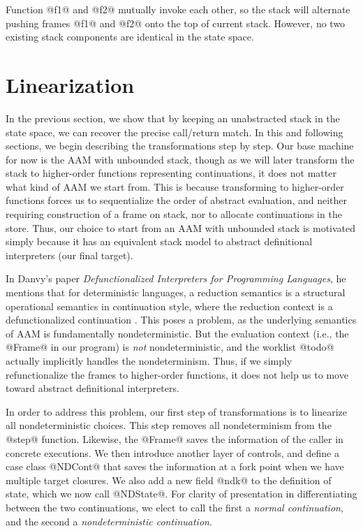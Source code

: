 \documentclass[acmsmall]{acmart}\settopmatter{}
\begin{document}
Function @f1@ and @f2@ mutually invoke each other, so the stack will
alternate pushing frames @f1@ and @f2@ onto the top of current stack.
However, no two existing stack components are identical in the state space.

\section{Linearization} \label{linear}

In the previous section, we show that by keeping an unabstracted stack in the state
space, we can recover the precise call/return match.
In this and following sections, we begin describing the transformations step by step.
Our base machine for now is the AAM with unbounded stack, though
as we will later transform the stack to higher-order functions
representing continuations, it does not matter what kind of AAM we start from.
This is because transforming to higher-order functions forces us to sequentialize
the order of abstract evaluation, and neither requiring construction of a frame on stack,
nor to allocate continuations in the store.
Thus, our choice to start from an AAM with unbounded stack is motivated simply because
it has an equivalent stack model to abstract definitional interpreters (our final target).

In Danvy's paper \textit{Defunctionalized Interpreters for Programming
  Languages}, he mentions that for deterministic languages, a reduction semantics
is a structural operational semantics in continuation style, where the reduction
context is a defunctionalized continuation \cite{Danvy:2008:DIP:1411204.1411206}.
This poses a problem, as the underlying semantics of AAM is fundamentally nondeterministic.
But the evaluation context (i.e., the @Frame@ in our program) is \emph{not}
nondeterministic, and the worklist @todo@ actually implicitly handles the nondeterminism.
Thus, if we simply refunctionalize the frames to higher-order functions, 
it does not help us to move toward abstract definitional interpreters.

In order to address this problem, our first step of transformations
is to linearize all nondeterministic choices.
This step removes all nondeterminism from the @step@ function.
Likewise, the @Frame@ saves the information of the caller in concrete executions.
We then introduce another layer of controls, and define a case class @NDCont@
that saves the information at a fork point when we have multiple target closures.
We also add a new field @ndk@ to the definition of state, which we now call @NDState@.
For clarity of presentation in differentiating between the two continuations, we elect to call
the first a \emph{normal continuation}, and the second a \emph{nondeterministic continuation}.
\end{document}
